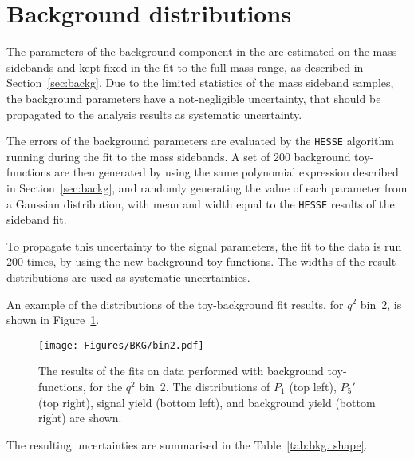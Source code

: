 \section{Background distributions}
\label{sec:sys-bkg}

The parameters of the background component in the \pdf are estimated on the mass sidebands and kept fixed in the fit to the full mass range, as described in Section~\ref{sec:backg}.
Due to the limited statistics of the mass sideband samples, the background parameters have a not-negligible uncertainty, that should be propagated to the analysis results as systematic uncertainty.

The errors of the background \pdf parameters are evaluated by the {\tt HESSE} algorithm running during the fit to the mass sidebands.
A set of 200 background toy-functions are then generated by using the same polynomial expression described in Section~\ref{sec:backg}, and randomly generating the value of each parameter from a Gaussian distribution, with mean and width equal to the {\tt HESSE} results of the sideband fit.

To propagate this uncertainty to the signal parameters, the fit to the data is run 200 times, by using the new background toy-functions. The widths of the result distributions are used as systematic uncertainties.

An example of the distributions of the toy-background fit results, for $q^2$ bin~2, is shown in Figure~\ref{fig:BKG-bin2}.

\begin{figure}[!hbt]
  \centering
  \texttt{[image: Figures/BKG/bin2.pdf]}
  \caption{The results of the fits on data performed with background toy-functions, for the $q^2$ bin~2.
    The distributions of $P_1$ (top left), $P_5'$ (top right), signal yield (bottom left), and background yield (bottom right) are shown.}
  \label{fig:BKG-bin2}
\end{figure}

The resulting uncertainties are summarised in the Table~\ref{tab:bkg. shape}.

